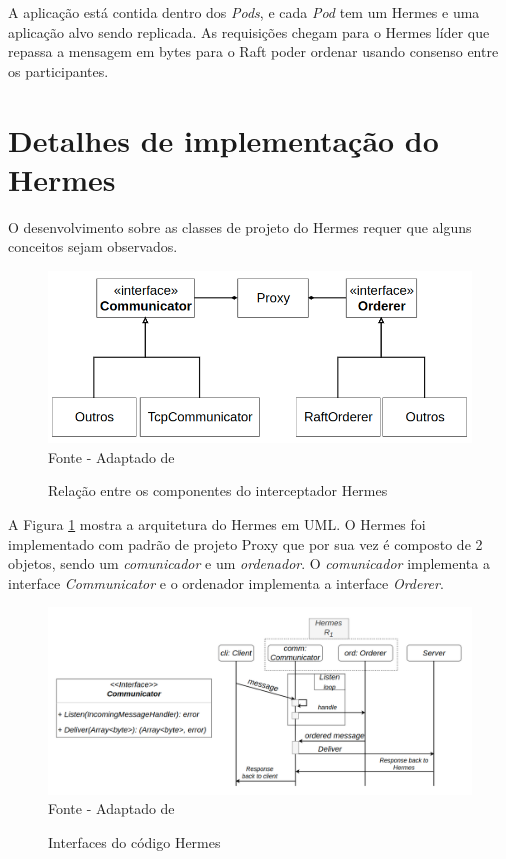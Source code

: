 A aplicação está contida dentro dos \textit{Pods}, e cada \textit{Pod} tem um Hermes e uma aplicação alvo sendo replicada. As requisições chegam para o Hermes líder que repassa a mensagem em bytes para o Raft poder ordenar usando consenso entre os participantes.


\section{Detalhes de implementação do Hermes}

O desenvolvimento sobre as classes de projeto do Hermes requer que alguns conceitos sejam observados.

\begin{figure}[!htb]
\centering
\caption{Relação entre os componentes do interceptador Hermes}
\includegraphics[width=0.9\linewidth]{figures/hermes-components.png}
\label{fig:componentes-hermes}
{\flushleft Fonte - Adaptado de \textcite{renan2021hermes}}
\end{figure}

A Figura \ref{fig:componentes-hermes} mostra a arquitetura do Hermes em UML. O Hermes foi implementado com padrão de projeto Proxy que por sua vez é composto de 2 objetos, sendo um \textit{comunicador} e um \textit{ordenador}. O \textit{comunicador} implementa a interface \textit{Communicator} e o ordenador implementa a interface \textit{Orderer}.

\begin{figure}[!htb]
\centering
\caption{Interfaces do código Hermes}
\includegraphics[width=\linewidth]{figures/communicator.drawio.png}
{\flushleft Fonte - Adaptado de \textcite{renan2021hermes}}
\label{fig:communicator-interfaces-hermes}
\end{figure}

